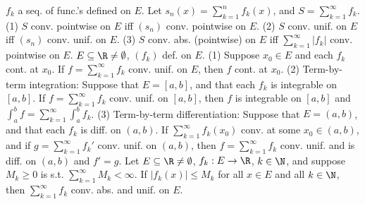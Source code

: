  $f_k$ a seq. of func.'s defined on $E$.
Let $s_n(x) = \sum_{k=1}^n f_k(x)$, and $S = \sum_{k=1}^\infty f_k$.
(1) $S$ conv. pointwise on $E$ iff $(s_n)$ conv. pointwise on $E$.
(2) $S$ conv. unif. on $E$ iff $(s_n)$ conv. unif. on $E$.
(3) $S$ conv. abs. (pointwise) on $E$ iff $\sum_{k=1}^\infty |f_k|$ conv. pointwise on $E$.
 $E \subseteq \R \neq \emptyset$, $(f_k)$ def. on $E$.
(1) Suppose $x_0 \in E$ and each $f_k$ cont. at $x_0$.
If $f = \sum_{k=1}^\infty f_k$ conv. unif. on $E$, then $f$ cont. at $x_0$.
(2) Term-by-term integration: Suppose that $E = [a,b]$, and that each $f_k$ is integrable on $[a,b]$.
If $f = \sum_{k=1}^\infty f_k$ conv. unif. on $[a,b]$, then $f$ is integrable on $[a,b]$ and
$\int_a^b f = \sum_{k=1}^\infty \int_a^b f_k$.
(3) Term-by-term differentiation: Suppose that $E = (a,b)$, and that each $f_k$ is diff. on $(a,b)$.
If $\sum_{k=1}^\infty f_k(x_0)$ conv. at some $x_0 \in (a,b)$, and if
$g = \sum_{k=1}^\infty f_k'$ conv. unif. on $(a,b)$,
then $f = \sum_{k=1}^\infty f_k$ conv. unif. and is diff. on $(a,b)$ and $f' = g$.
Let $E \subseteq \R \neq \emptyset$, $f_k: E \to \R$, $k \in \N$,
and suppose $M_k \ge 0$ is s.t. $\sum_{k=1}^\infty M_k < \infty$.
If $|f_k(x)| \le M_k$ for all $x \in E$ and all $k \in \N$, then
$\sum_{k=1}^\infty f_k$ conv. abs. and unif. on $E$.